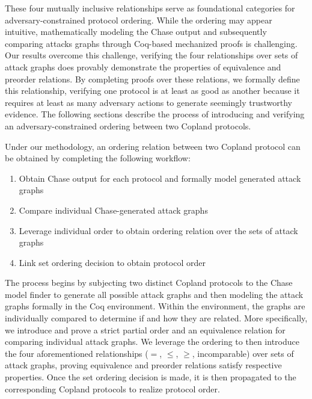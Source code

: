 \documentclass[runningheads]{llncs}
\theoremstyle{definition}
\newcommand{\squash}{\itemsep=0pt\parskip=0pt}
\begin{document}

These four mutually inclusive relationships serve as foundational categories for adversary-constrained protocol ordering. While the ordering may appear intuitive, mathematically modeling the Chase output and subsequently comparing attacks graphs through Coq-based mechanized proofs is challenging. Our results overcome this challenge, verifying the four relationships over sets of attack graphs does provably demonstrate the properties of equivalence and preorder relations. By completing proofs over these relations, we formally define this relationship, verifying one protocol is at least as good as another because it requires at least as many adversary actions to generate seemingly trustworthy evidence. The following sections describe the process of introducing and verifying an adversary-constrained ordering between two Copland protocols. 

Under our methodology, an ordering relation between two Copland protocol can be obtained by completing the following workflow:

\begin{enumerate}
    \squash
    \item Obtain Chase output for each protocol and formally model generated attack graphs
    \item Compare individual Chase-generated attack graphs
    \item Leverage individual order to obtain ordering relation over the sets of attack graphs
    \item Link set ordering decision to obtain protocol order
\end{enumerate}

\noindent The process begins by subjecting two distinct Copland protocols to the Chase model finder to generate all possible attack graphs and then modeling the attack graphs formally in the Coq environment. Within the environment, the graphs are individually compared to determine if and how they are related. More specifically, we introduce and prove a strict partial order and an equivalence relation for comparing individual attack graphs. We leverage the ordering to then introduce the four aforementioned relationships ($=$, $\leq$, $\geq$, incomparable) over sets of attack graphs, proving equivalence and preorder relations satisfy respective properties. Once the set ordering decision is made, it is then propagated to the corresponding Copland protocols to realize protocol order. 
\end{document}

